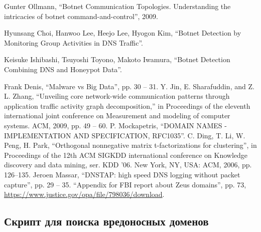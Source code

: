 \documentclass[a4paper,14pt]{extreport} %
\begin{document}
\begin{thebibliography}{99}
	
			
	 Gunter Ollmann, ``Botnet Communication Topologies. Understanding the intricacies of botnet command-and-control'', 2009.
			
	 Hyunsang Choi, Hanwoo Lee, Heejo Lee, Hyogon Kim, ``Botnet Detection by Monitoring Group Activities in
	DNS Traffic''.
			
	 Keisuke Ishibashi, Tsuyoshi Toyono, Makoto Iwamura, ``Botnet Detection Combining DNS and Honeypot Data''.
			
	 Frank Denis, ``Malware vs Big Data'', pp. 30 -- 31.
	 Y. Jin, E. Sharafuddin, and Z. L. Zhang, “Unveiling core network-wide communication patterns through application traffic activity graph decomposition,” in Proceedings of the eleventh international joint conference on Measurement and modeling of computer systems. ACM, 2009, pp. 49 -- 60.
	  P. Mockapetris, ``DOMAIN NAMES - IMPLEMENTATION AND SPECIFICATION, RFC1035''.
	 C. Ding, T. Li, W. Peng, H. Park, ``Orthogonal nonnegative matrix t-factorizations for clustering'', in Proceedings of the 12th ACM SIGKDD
	international conference on Knowledge discovery and data mining, ser.
	KDD ’06. New York, NY, USA: ACM, 2006, pp. 126–135.
	 Jeroen Massar, ``DNSTAP: high speed DNS logging without packet capture'', pp. 29 -- 35.
	 ``Appendix for FBI report about Zeus domains'', pp. 73, \url{https://www.justice.gov/opa/file/798036/download}.
\end{thebibliography}

\begin{appendices}
	\chapter{Скрипт для поиска вредоносных доменов}
	\label{appendix:code}
	
\end{appendices}
\end{document}
